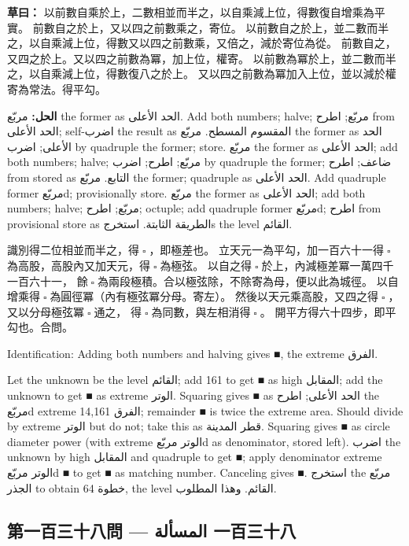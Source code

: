\documentclass[11pt,a4paper]{article}
\newcommand{\ar}[1]{\arabicfont\beginR #1\endR}
\newcommand{\ChinCol}[1]{\begin{minipage}[t]{0.48\textwidth}#1\end{minipage}}
\newcommand{\ArabCol}[1]{\begin{minipage}[t]{0.48\textwidth}\arabicfont\beginR #1\endR\end{minipage}}
\newcommand{\parallelsection}[2]{%
  \noindent\ChinCol{#1}\hfill\ArabCol{#2}\par\vspace{0.5cm}%
}
\newcommand{\working}[2]{\par\noindent%
  \begin{minipage}[t]{0.48\textwidth}\textbf{草曰：}#1\end{minipage}%
  \hfill%
  \begin{minipage}[t]{0.48\textwidth}\arabicfont\beginR\textbf{الحل:} #2\endR\end{minipage}\par\vspace{0.2cm}}
\begin{document}
\working{%
以前數自乘於上，二數相並而半之，以自乘減上位，得數復自增乘為平實。
前數自之於上，又以四之前數乘之，寄位。
以前數自之於上，並二數而半之，以自乘減上位，得數又以四之前數乘，又倍之，減於寄位為從。
前數自之，又四之於上。又以四之前數為冪，加上位，權寄。
以前數為冪於上，並二數而半之，以自乘減上位，得數復八之於上。
又以四之前數為冪加入上位，並以減於權寄為常法。得平勾。}{%
مربّع the former as الحد الأعلى. Add both numbers; halve; مربّع; اطرح from الحد الأعلى; self-اضرب the result as المقسوم المسطح. مربّع the former as الحد الأعلى; اضرب by quadruple the former; store. مربّع the former as الحد الأعلى; add both numbers; halve; مربّع; اطرح; اضرب by quadruple the former; ضاعف; اطرح from stored as التابع. مربّع the former; quadruple as الحد الأعلى. Add quadruple former مربّعd; provisionally store. مربّع the former as الحد الأعلى; add both numbers; halve; مربّع; اطرح; octuple; add quadruple former مربّعd; اطرح from provisional store as الطريقة الثابتة. استخرجs the level القائم.}

\parallelsection{%
識別得二位相並而半之，得$ \; \square \; $，即極差也。
立天元一為平勾，加一百六十一得$ \; \square \; $為高股，高股內又加天元，得$ \; \square \; $為極弦。
以自之得$ \; \square \; $於上，內減極差冪一萬四千一百六十一，
餘$ \; \square \; $為兩段極積。合以極弦除，不除寄為母，便以此為城徑。
以自增乘得$ \; \square \; $為圓徑冪（內有極弦冪分母。寄左）。
然後以天元乘高股，又四之得$ \; \square \; $，又以分母極弦冪$ \; \square \; $通之，
得$ \; \square \; $為同數，與左相消得$ \; \square \; $。
開平方得六十四步，即平勾也。合問。}{%
Identification: Adding both numbers and halving gives ■, the extreme الفرق.

Let the unknown be the level القائم; add 161 to get ■ as high المقابل; add the unknown to get ■ as extreme الوتر. Squaring gives ■ as الحد الأعلى; اطرح the مربّعd extreme الفرق 14,161; remainder ■ is twice the extreme area. Should divide by extreme الوتر but do not; take this as قطر المدينة. Squaring gives ■ as circle diameter power (with extreme الوتر مربّعd as denominator, stored left). اضرب the unknown by high المقابل and quadruple to get ■; apply denominator extreme الوتر مربّعd ■ to get ■ as matching number. Canceling gives ■. استخرج the مربّع الجذر to obtain 64 خطوة, the level القائم. وهذا المطلوب.}

\vspace{0.5cm}

\subsection*{第一百三十八問 --- \ar{المسألة 一百三十八}}
\end{document}
